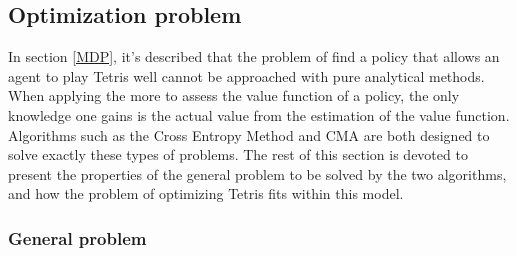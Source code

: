 \subsection{Optimization problem}

In section \ref{MDP}, it's described that the problem of
find a policy that allows an agent to play Tetris well
cannot be approached with pure analytical methods.
When applying the more%
to assess the value function of a policy, the only 
knowledge one gains is the actual value from the estimation 
of the value function. Algorithms such as the Cross Entropy Method
and CMA are both designed to solve exactly these types of problems.
The rest of this section is devoted to present the properties of the 
general problem to be solved by the two algorithms, and how the 
problem of optimizing Tetris fits within this model.

\subsubsection{General problem \label{ProblemFormulation}}

